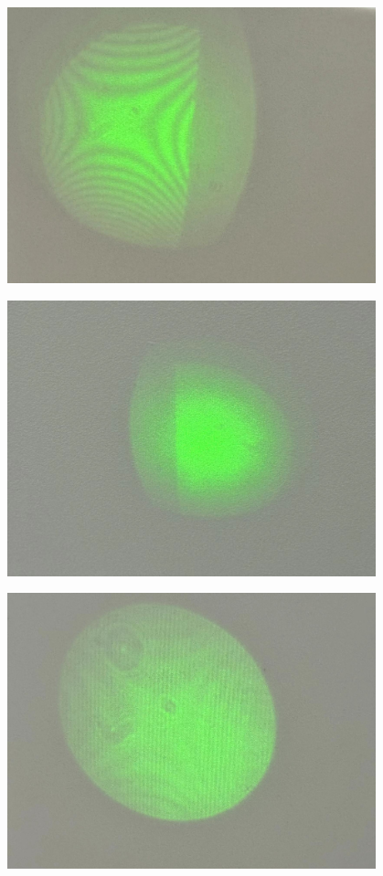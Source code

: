 \documentclass[10pt]{ctexart}
\begin{document}
\begin{minipage}{\textwidth} 
    \includegraphics[width=0.8\textwidth]{不加任何偏振片.jpg}
\end{minipage}
\begin{minipage}{\textwidth} 
    \includegraphics[width=0.8\textwidth]{两边加入偏振方向相互垂直的偏振片后的图像.jpg}
\end{minipage}
\begin{minipage}{\textwidth} 
    \includegraphics[width=0.8\textwidth]{加入45度偏振片.jpg}
\end{minipage}
\end{document}
